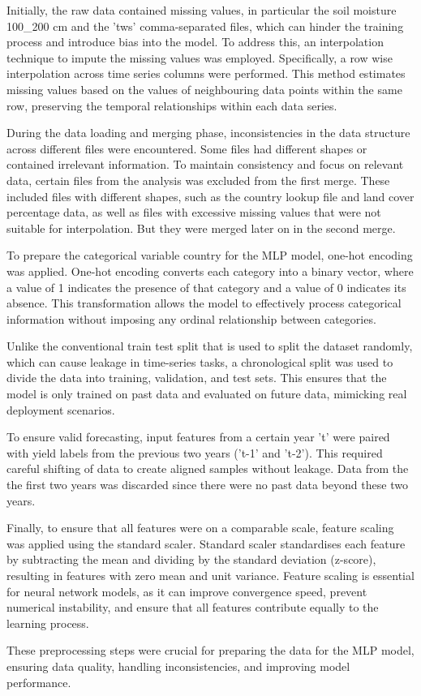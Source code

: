 \documentclass[a4paper, 12pt]{article}
\begin{document}
Initially, the raw data contained missing values, in particular the soil moisture 100\_200 cm and the 'tws' comma-separated files, which can hinder the training process and introduce bias into the model. To address this, an interpolation technique to impute the missing values was employed. Specifically, a row wise interpolation across time series columns were performed. This method estimates missing values based on the values of neighbouring data points within the same row, preserving the temporal relationships within each data series.

During the data loading and merging phase, inconsistencies in the data structure across different files were encountered. Some files had different shapes or contained irrelevant information. To maintain consistency and focus on relevant data, certain files from the analysis was excluded from the first merge. These included files with different shapes, such as the country lookup file and land cover percentage data, as well as files with excessive missing values that were not suitable for interpolation. But they were merged later on in the second merge.

To prepare the categorical variable country for the MLP model, one-hot encoding was applied. One-hot encoding converts each category into a binary vector, where a value of 1 indicates the presence of that category and a value of 0 indicates its absence. This transformation allows the model to effectively process categorical information without imposing any ordinal relationship between categories.

Unlike the conventional train test split that is used to split the dataset randomly, which can cause leakage in time-series tasks, a chronological split was used to divide the data into training, validation, and test sets. This ensures that the model is only trained on past data and evaluated on future data, mimicking real deployment scenarios.

To ensure valid forecasting, input features from a certain year 't' were paired with yield labels from the previous two years ('t-1' and 't-2'). This required careful shifting of data to create aligned samples without leakage. Data from the the first two years was discarded since there were no past data beyond these two years.

Finally, to ensure that all features were on a comparable scale, feature scaling was applied using the standard scaler. Standard scaler standardises each feature by subtracting the mean and dividing by the standard deviation (z-score), resulting in features with zero mean and unit variance. Feature scaling is essential for neural network models, as it can improve convergence speed, prevent numerical instability, and ensure that all features contribute equally to the learning process.

These preprocessing steps were crucial for preparing the data for the MLP model, ensuring data quality, handling inconsistencies, and improving model performance.
\end{document}
